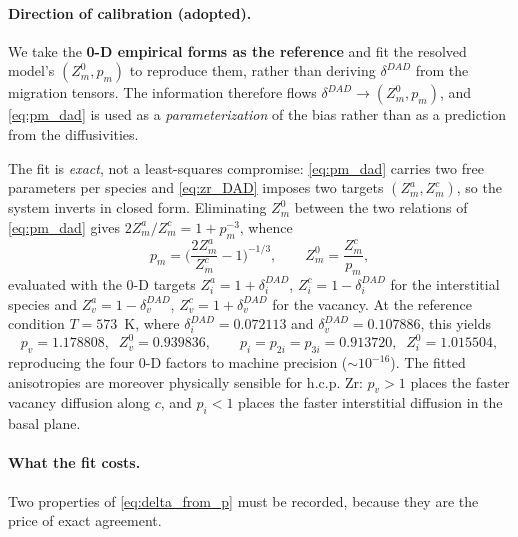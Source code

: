 \documentclass[11pt]{article}
\begin{document}
\paragraph{Direction of calibration (adopted).}
We take the \textbf{0-D empirical forms as the reference} and fit the resolved
model's $(Z^0_m,p_m)$ to reproduce them, rather than deriving $\delta^{DAD}$ from
the migration tensors. The information therefore flows
$\delta^{DAD}\!\to\!(Z^0_m,p_m)$, and \eqref{eq:pm_dad} is used as a
\emph{parameterization} of the bias rather than as a prediction from the
diffusivities.

The fit is \emph{exact}, not a least-squares compromise: \eqref{eq:pm_dad}
carries two free parameters per species and \eqref{eq:zr_DAD} imposes two targets
$(Z^a_m,Z^c_m)$, so the system inverts in closed form. Eliminating $Z^0_m$
between the two relations of \eqref{eq:pm_dad} gives $2Z^a_m/Z^c_m=1+p_m^{-3}$,
whence
\begin{equation}
\label{eq:delta_from_p}
    p_m=\Big(\frac{2Z^a_m}{Z^c_m}-1\Big)^{-1/3},
    \qquad
    Z^0_m=\frac{Z^c_m}{p_m},
\end{equation}
evaluated with the 0-D targets $Z^a_i=1+\delta^{DAD}_i$, $Z^c_i=1-\delta^{DAD}_i$
for the interstitial species and $Z^a_v=1-\delta^{DAD}_v$,
$Z^c_v=1+\delta^{DAD}_v$ for the vacancy. At the reference condition
$T=573$~K, where $\delta^{DAD}_i=0.072113$ and $\delta^{DAD}_v=0.107886$, this
yields
\begin{equation}
\label{eq:dad_fitted}
    p_v=1.178808,\;\; Z^0_v=0.939836,
    \qquad
    p_i=p_{2i}=p_{3i}=0.913720,\;\; Z^0_i=1.015504,
\end{equation}
reproducing the four 0-D factors to machine precision ($\sim\!10^{-16}$). The
fitted anisotropies are moreover physically sensible for h.c.p. Zr: $p_v>1$
places the faster vacancy diffusion along $c$, and $p_i<1$ places the faster
interstitial diffusion in the basal plane.

\paragraph{What the fit costs.}
Two properties of \eqref{eq:delta_from_p} must be recorded, because they are the
price of exact agreement.
\end{document}
